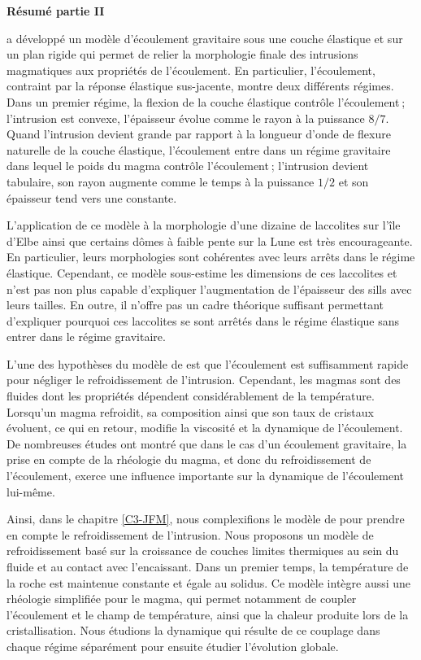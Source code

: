 \thispagestyle{plain}
\begin{flushleft}
 \Large \vspace{.5cm} \textbf{Résumé partie II}
\end{flushleft}

\citet{Michaut:2011kg} a développé un modèle d’écoulement gravitaire
sous une couche élastique et sur un plan rigide qui permet de relier
la morphologie finale des intrusions magmatiques aux propriétés de
l’écoulement. En particulier, l’écoulement, contraint par la réponse
élastique sus-jacente, montre deux différents régimes. Dans un premier
régime, la flexion de la couche élastique contrôle l’écoulement ;
l’intrusion est convexe, l’épaisseur évolue comme le rayon à la
puissance $8/7$. Quand l’intrusion devient grande par rapport à la
longueur d’onde de flexure naturelle de la couche élastique,
l’écoulement entre dans un régime gravitaire dans lequel le poids du
magma contrôle l’écoulement ; l’intrusion devient tabulaire, son rayon
augmente comme le temps à la puissance $1/2$ et son épaisseur tend
vers une constante.

L’application de ce modèle à la morphologie d’une dizaine de
laccolites sur l’île d’Elbe ainsi que certains dômes à faible pente
sur la Lune est très encourageante. En particulier, leurs morphologies
sont cohérentes avec leurs arrêts dans le régime élastique. Cependant,
ce modèle sous-estime les dimensions de ces laccolites et n’est pas
non plus capable d’expliquer l’augmentation de l’épaisseur des sills
avec leurs tailles. En outre, il n’offre pas un cadre théorique
suffisant permettant d’expliquer pourquoi ces laccolites se sont
arrêtés dans le régime élastique sans entrer dans le régime
gravitaire.

L’une des hypothèses du modèle de \citet{Michaut:2011kg} est que
l’écoulement est suffisamment rapide pour négliger le refroidissement
de l’intrusion. Cependant, les magmas sont des fluides dont les
propriétés dépendent considérablement de la température. Lorsqu’un
magma refroidit, sa composition ainsi que son taux de cristaux
évoluent, ce qui en retour, modifie la viscosité et la dynamique de
l’écoulement. De nombreuses études ont montré que dans le cas d’un
écoulement gravitaire, la prise en compte de la rhéologie du magma, et
donc du refroidissement de l’écoulement, exerce une influence
importante sur la dynamique de l’écoulement lui-même.

Ainsi, dans le chapitre \ref{C3-JFM}, nous complexifions le modèle de
\citet{Michaut:2011kg} pour prendre en compte le refroidissement de
l’intrusion. Nous proposons un modèle de refroidissement basé sur la
croissance de couches limites thermiques au sein du fluide et au
contact avec l'encaissant. Dans un premier temps, la température de la
roche est maintenue constante et égale au solidus. Ce modèle intègre
aussi une rhéologie simplifiée pour le magma, qui permet notamment de
coupler l’écoulement et le champ de température, ainsi que la chaleur
produite lors de la cristallisation. Nous étudions la dynamique qui
résulte de ce couplage dans chaque régime séparément pour ensuite
étudier l’évolution globale.

